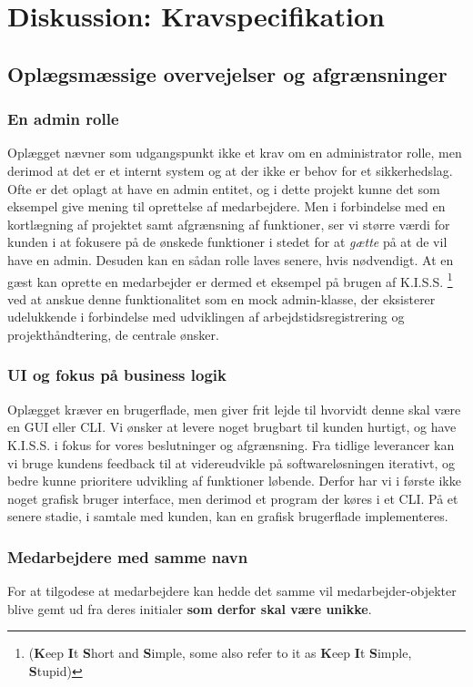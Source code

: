 \section{Diskussion: Kravspecifikation}
\subsection{Oplægsmæssige overvejelser og afgrænsninger}
\subsubsection{En admin rolle}
Oplægget nævner som udgangspunkt ikke et krav om en administrator rolle, men derimod at det er et internt system og at der ikke er behov for et sikkerhedslag. Ofte er det oplagt at have en admin entitet, og i dette projekt kunne det som eksempel give mening til oprettelse af medarbejdere. Men i forbindelse med en kortlægning af projektet samt afgrænsning af funktioner, ser vi større værdi for kunden i at fokusere på de ønskede funktioner i stedet for at \textit{gætte} på at de vil have en admin. Desuden kan en sådan rolle laves senere, hvis nødvendigt. At en gæst kan oprette en medarbejder er dermed et eksempel på brugen af K.I.S.S. \footnote{(\textbf{K}eep \textbf{I}t \textbf{S}hort and \textbf{S}imple, some also refer to it as \textbf{K}eep \textbf{I}t \textbf{S}imple, \textbf{S}tupid)} ved at anskue denne funktionalitet som en mock admin-klasse, der eksisterer udelukkende i forbindelse med udviklingen af arbejdstidsregistrering og projekthåndtering, de centrale ønsker.
\subsubsection{UI og fokus på business logik}
Oplægget kræver en brugerflade, men giver frit lejde til hvorvidt denne skal være en GUI eller CLI. Vi ønsker at levere noget brugbart til kunden hurtigt, og have K.I.S.S. i fokus for vores beslutninger og afgrænsning. Fra tidlige leverancer kan vi bruge kundens feedback til at videreudvikle på softwareløsningen iterativt, og bedre kunne prioritere udvikling af funktioner løbende. Derfor har vi i første ikke noget grafisk bruger interface, men derimod et program der køres i et CLI. På et senere stadie, i samtale med kunden, kan en grafisk brugerflade implementeres.
\subsubsection{Medarbejdere med samme navn}
For at tilgodese at medarbejdere kan hedde det samme vil medarbejder-objekter blive gemt ud fra deres initialer \textbf{som derfor skal være unikke}.
